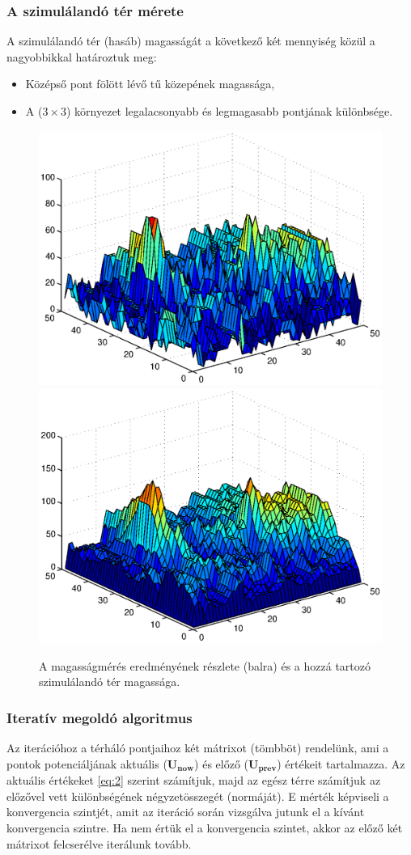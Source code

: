 		\subsubsection{A szimulálandó tér mérete}
		A szimulálandó tér (hasáb) magasságát a következő két mennyiség közül a
		nagyobbikkal határoztuk meg:
		\begin{itemize}
			\item Középső pont fölött lévő tű közepének magassága,
			\item A ($3\times3$) környezet legalacsonyabb és legmagasabb pontjának
			különbsége.
		\end{itemize}
		
		\begin{figure}[!h]
			\centering
			\includegraphics[width=0.45\columnwidth]{kepek/dimage.eps}
			\includegraphics[width=0.45\columnwidth]{kepek/numh.eps}
			\caption{A magasságmérés eredményének részlete (balra) és a hozzá tartozó
			szimulálandó tér magassága.}
		\end{figure}
		
		\subsubsection{Iteratív megoldó algoritmus}
		Az iterációhoz a térháló pontjaihoz két mátrixot (tömbböt) rendelünk, ami a
		pontok potenciáljának aktuális ($\mathbf{U_{now}}$) és előző ($\mathbf{U_{prev}}$)
		értékeit tartalmazza.
		Az aktuális értékeket \eqref{eq:2} szerint számítjuk, majd az egész térre
		számítjuk az előzővel vett különbségének négyzetösszegét (normáját). E mérték
		képviseli a konvergencia szintjét, amit az iteráció során vizsgálva jutunk el a
		kívánt konvergencia szintre.
		Ha nem értük el a konvergencia szintet, akkor az előző két mátrixot
		felcserélve iterálunk tovább.
		
